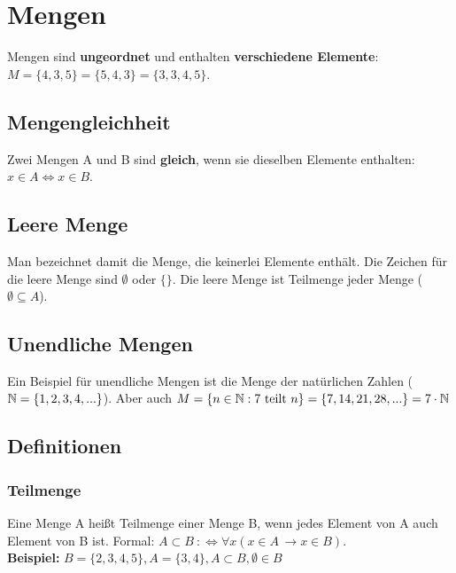 \renewcommand{\ldate}{2015-03-16}	%

\section{Mengen} 
Mengen sind \textbf{ungeordnet} und enthalten \textbf{verschiedene Elemente}: $M=\{4,3,5\}=\{5,4,3\}=\{3,3,4,5\}$. 

\subsection{Mengengleichheit}
Zwei Mengen A und B sind \textbf{gleich}, wenn sie dieselben Elemente enthalten: $x \in A \Leftrightarrow x \in B$.

\subsection{Leere Menge} 
Man bezeichnet damit die Menge, die keinerlei Elemente enthält. Die Zeichen für die leere Menge sind $\emptyset$ oder $\{\}$. Die leere Menge ist Teilmenge jeder Menge ($\emptyset \subseteq A$).

\subsection{Unendliche Mengen}
Ein Beispiel für unendliche Mengen ist die Menge der natürlichen Zahlen ($\mathbb{N}=\{1,2,3,4,...\}$). Aber auch $M=\{n \in \mathbb{N} : 7 \textrm{ teilt }n\}=\{7,14,21,28,...\}=7 \cdot  \mathbb{N}$

\subsection{Definitionen}

\subsubsection{Teilmenge}
Eine Menge A heißt Teilmenge einer Menge B, wenn jedes Element von A auch Element von B ist. Formal: $A\subset B\ :\Longleftrightarrow \forall x \left(x \in A \,\rightarrow x \in B \right)$.\\
\textbf{Beispiel:} $B=\{2,3,4,5\}, A=\{3,4\}, A\subset B, \emptyset \in B$  %

